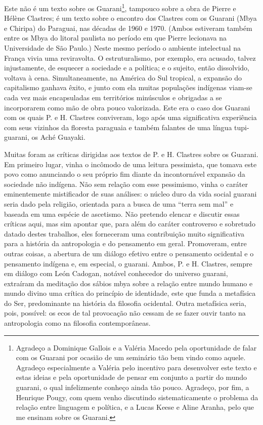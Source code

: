 Este não é um texto sobre os Guarani\footnote{Agradeço a Dominique
Gallois e a Valéria Macedo pela oportunidade de falar com os Guarani
por ocasião de um seminário tão bem vindo como aquele. Agradeço
especialmente a Valéria pelo incentivo para desenvolver este texto e
estas ideias e pela oportunidade de pensar em conjunto a partir do
mundo guarani, o qual infelizmente conheço ainda tão pouco. Agradeço,
por fim, a Henrique Pougy, com quem venho discutindo sistematicamente o
problema da relação entre linguagem e política, e a Lucas Keese e Aline
Aranha, pelo que me ensinam sobre os Guarani.}, tampouco sobre a obra
de Pierre e Hélène Clastres; é um texto sobre o encontro dos Clastres
com os Guarani (Mbya e Chiripa) do Paraguai, nas décadas de 1960 e
1970. (Ambos estiveram também entre os Mbya do litoral paulista no
período em que Pierre lecionava na Universidade de São Paulo.) Neste
mesmo período o ambiente intelectual na França vivia uma reviravolta. O
estruturalismo, por exemplo, era acusado, talvez injustamente, de
esquecer a sociedade e a política; e o sujeito, então dissolvido,
voltava à cena. Simultaneamente, na América do Sul tropical, a expansão
do capitalismo ganhava êxito, e junto com ela muitas populações
indígenas viam-se cada vez mais encapsuladas em territórios minúsculos
e obrigadas a se incorporarem como mão de obra pouco valorizada. Este
era o caso dos Guarani com os quais P. e H. Clastres conviveram, logo
após uma significativa experiência com seus vizinhos da floresta
paraguaia e também falantes de uma língua tupi-guarani, os Aché
Guayaki.

Muitas foram as críticas dirigidas aos textos de P. e H. Clastres sobre
os Guarani. Em primeiro lugar, vinha o incômodo de uma leitura
pessimista, que tomava este povo como anunciando o seu próprio fim
diante da incontornável expansão da sociedade não indígena. Não sem
relação com esse pessimismo, vinha o caráter eminentemente mistificador
de suas análises: o núcleo duro da vida social guarani seria dado pela
religião, orientada para a busca de uma ``terra sem mal'' e baseada em
uma espécie de ascetismo. Não pretendo elencar e discutir essas
críticas aqui, mas sim apontar que, para além do caráter controverso e
sobretudo datado destes trabalhos, eles forneceram uma contribuição
muito significativa para a história da antropologia e do pensamento em
geral. Promoveram, entre outras coisas, a abertura de um diálogo
efetivo entre o pensamento ocidental e o pensamento indígena e, em
especial, o guarani. Ambos, P. e H. Clastres, sempre em diálogo com
León Cadogan, notável conhecedor do universo guarani, extraíram da
meditação dos sábios mbya sobre a relação entre mundo humano e mundo
divino uma crítica do princípio de identidade, este que funda a
metafísica do Ser, predominante na história da filosofia ocidental.
Outra metafísica seria, pois, possível: os ecos de tal provocação não
cessam de se fazer ouvir tanto na antropologia como na filosofia
contemporâneas.

